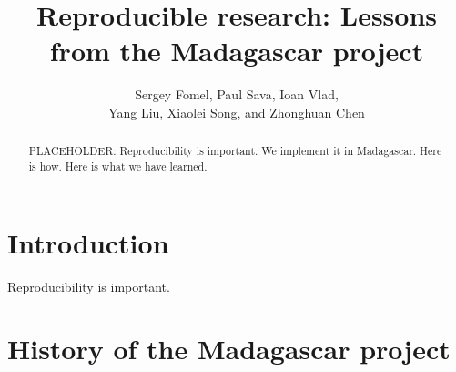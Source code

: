 \title{Reproducible research: Lessons from the Madagascar project}


\author{
Sergey Fomel\footnotemark[1],
Paul Sava\footnotemark[2],
Ioan Vlad\footnotemark[3], \\
Yang Liu\footnotemark[4],
Xiaolei Song\footnotemark[1], and
Zhonghuan Chen\footnotemark[5]
}

\address{
\footnotemark[1]Bureau of Economic Geology \\
Jackson School of Geosciences \\
The University of Texas at Austin \\
University Station, Box X \\
Austin, TX 78713-8972 \\
USA \\
\footnotemark[2] Department of Geophysics \\
Colorado School of Mines \\
Golden, CO 80401 \\
USA \\
\footnotemark[3] TGS \\
2500 CityWest Boulevard, Suite 2000 \\
Houston, Texas 77042
USA \\
\footnotemark[4] College of Geo-Exploration Science and Technology \\
Jilin University \\
No.938 Xi Minzhu Street \\
Changchun, Jilin Province 130026
China
}

\begin{abstract}
PLACEHOLDER: Reproducibility is important. We implement it in Madagascar. Here is how. Here is what we have learned.
\end{abstract}

\section{Introduction}

Reproducibility is important.

\section{History of the Madagascar project}

